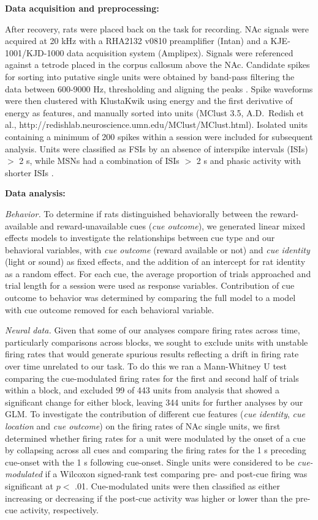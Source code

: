 \documentclass[11pt]{article}
\let\cite=\citep
\begin{document}
{\bf Data acquisition and preprocessing:}

After recovery, rats were placed back on the task for recording. NAc
signals were acquired at 20 kHz with a RHA2132 v0810 preamplifier
(Intan) and a KJE-1001/KJD-1000 data acquisition system
(Amplipex). Signals were referenced against a tetrode placed in the
corpus callosum above the NAc. Candidate spikes for sorting into
putative single units were obtained by band-pass filtering the data
between 600-9000 Hz, thresholding and aligning the peaks \cite[UltraMegaSort2k, ][]{Hill2011}. Spike waveforms were then
clustered with KlustaKwik using energy and the first derivative of
energy as features, and manually sorted into units (MClust 3.5,
A.D.\ Redish et al., http://redishlab.neuroscience.umn.edu/MClust/MClust.html). Isolated units containing a minimum of 200
spikes within a session were included for subsequent analysis. Units
were classified as FSIs by an absence of
interspike intervals (ISIs) $>$ 2 s, while MSNs
had a combination of ISIs $>$ 2 s and phasic activity with shorter
ISIs \cite{Barnes2005,Atallah2014}.

{\bf Data analysis:}

{\it Behavior.} To determine if rats distinguished behaviorally
between the reward-available and reward-unavailable cues ({\it cue
outcome}), we generated linear mixed effects models to investigate
the relationships between cue type and our behavioral variables, with
{\it cue outcome} (reward available or not) and {\it cue identity}
(light or sound) as fixed effects, and the addition of an intercept
for rat identity as a random effect. For each cue, the average
proportion of trials approached and trial length for a session were
used as response variables. Contribution of cue outcome to behavior
was determined by comparing the full model to a model with cue outcome
removed for each behavioral variable.

{\it Neural data.} Given that some of our analyses compare firing rates across time,
particularly comparisons across blocks, we sought to exclude units
with unstable firing rates that would generate spurious results
reflecting a drift in firing rate over time unrelated to our task. To
do this we ran a Mann-Whitney U test comparing the cue-modulated firing
rates for the first and second half of trials within a block, and
excluded 99 of 443 units from analysis that showed a significant change for
either block, leaving 344 units for further analyses by our GLM. To investigate the contribution of different cue
features ({\it cue identity}, {\it cue location} and {\it cue outcome}) on the firing rates of NAc
single units, we first determined whether firing rates for a unit
were modulated by the onset of a cue by collapsing across all cues
and comparing the firing rates for the 1 s preceding cue-onset with
the 1 s following cue-onset. Single units were considered to be {\it
cue-modulated} if a Wilcoxon signed-rank test comparing pre- and
post-cue firing was significant at $p <$ .01. Cue-modulated units
were then classified as either increasing or decreasing if the
post-cue activity was higher or lower than the pre-cue activity,
respectively.
\end{document}

